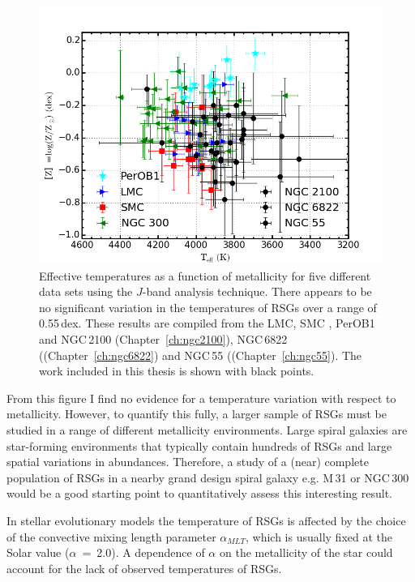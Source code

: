 \begin{figure}
 \centering
\includegraphics[width=\textwidth]{conclusions/RSGTeffvsZ-all}
\caption[Effective temperature as a function of metallicity in different environments]{
Effective temperatures as a function of metallicity for five different data sets using the $J$-band analysis technique.
There appears to be no significant variation in the temperatures of RSGs over a range of 0.55\,dex.
These results are compiled from the LMC, SMC
\protect\citep[blue and red points respectively;][]{2015ApJ...806...21D}, PerOB1
\protect\citep[a Galactic RSG cluster; cyan;][]{2014ApJ...788...58G} and
NGC\,2100 (Chapter~\ref{ch:ngc2100}),
NGC\,6822 ((Chapter~\ref{ch:ngc6822})
and NGC\,55 ((Chapter~\ref{ch:ngc55}).
The work included in this thesis is shown with black points.
\label{fig:TeffvsZ}
         }
\end{figure}

From this figure I find no evidence for a temperature variation with respect to metallicity.
However, to quantify this fully, a larger sample of RSGs must be studied in a range of different metallicity environments.
Large spiral galaxies are star-forming environments that typically contain hundreds of RSGs and large spatial variations in abundances.
Therefore, a study of a (near) complete population of RSGs in a nearby grand design spiral galaxy e.g. M\,31 or NGC\,300 would be a good starting point to quantitatively assess this interesting result.

In stellar evolutionary models the temperature of RSGs is affected by the choice of the convective mixing length parameter $\alpha_{MLT}$, which is usually fixed at the Solar value ($\alpha$~=~2.0).
A dependence of $\alpha$ on the metallicity of the star could account for the lack of observed temperatures of RSGs.

